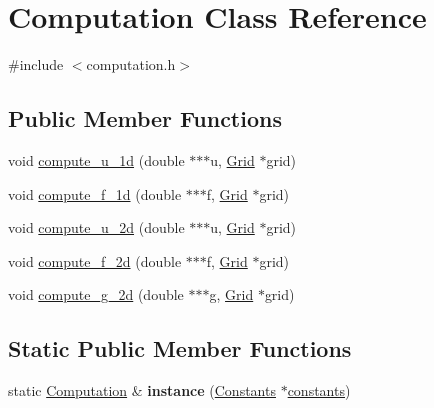 \hypertarget{classComputation}{\section{Computation Class Reference}
\label{classComputation}
}


{\ttfamily \#include $<$computation.\-h$>$}

\subsection*{Public Member Functions}
\begin{DoxyCompactItemize}
\item 
void \hyperlink{classComputation_af2a835928bcf124b803756730b47aecb}{compute\-\_\-u\-\_\-1d} (double $\ast$$\ast$$\ast$u, \hyperlink{classGrid}{Grid} $\ast$grid)
\item 
void \hyperlink{classComputation_a6ae111f850757aa9e494b25fa397bfb5}{compute\-\_\-f\-\_\-1d} (double $\ast$$\ast$$\ast$f, \hyperlink{classGrid}{Grid} $\ast$grid)
\item 
void \hyperlink{classComputation_a158cbdbd7b5a770b9e96175287421dd1}{compute\-\_\-u\-\_\-2d} (double $\ast$$\ast$$\ast$u, \hyperlink{classGrid}{Grid} $\ast$grid)
\item 
void \hyperlink{classComputation_a86cd911682059748fa6a0031c69275f0}{compute\-\_\-f\-\_\-2d} (double $\ast$$\ast$$\ast$f, \hyperlink{classGrid}{Grid} $\ast$grid)
\item 
void \hyperlink{classComputation_aa41d173cd841966f00bedd9e040b5e78}{compute\-\_\-g\-\_\-2d} (double $\ast$$\ast$$\ast$g, \hyperlink{classGrid}{Grid} $\ast$grid)
\end{DoxyCompactItemize}
\subsection*{Static Public Member Functions}
\begin{DoxyCompactItemize}
\item 
\hypertarget{classComputation_a8900cb37bdf5e88b60c3472423df8bbf}{static \hyperlink{classComputation}{Computation} \& {\bfseries instance} (\hyperlink{classConstants}{Constants} $\ast$\hyperlink{classComputation_ad83b15fa4885674df22b99bb3f9ffc40}{constants})}\label{classComputation_a8900cb37bdf5e88b60c3472423df8bbf}

\end{DoxyCompactItemize}

